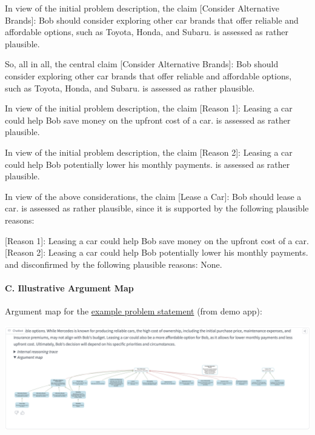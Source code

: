 \documentclass[
  letterpaper,
  DIV=11,
  numbers=noendperiod]{scrartcl}
\let\oldparagraph\paragraph
\renewcommand{\paragraph}[1]{\oldparagraph{#1}\mbox{}}
\newenvironment{Shaded}{\begin{snugshade}}{\end{snugshade}}
\newcommand{\CommentTok}[1]{\textcolor[rgb]{0.37,0.37,0.37}{#1}}
\newcommand{\NormalTok}[1]{\textcolor[rgb]{0.00,0.23,0.31}{#1}}
\newcommand{\OtherTok}[1]{\textcolor[rgb]{0.00,0.23,0.31}{#1}}
\begin{document}
\begin{Shaded}
\begin{Highlighting}[]
\NormalTok{In view of the initial problem description, the claim \textquotesingle{}}\CommentTok{[}\OtherTok{Consider Alternative Brands}\CommentTok{]}\NormalTok{: Bob should consider exploring other car brands that offer reliable and affordable options, such as Toyota, Honda, and Subaru.\textquotesingle{} is assessed as rather plausible.}

\NormalTok{So, all in all, the central claim \textquotesingle{}}\CommentTok{[}\OtherTok{Consider Alternative Brands}\CommentTok{]}\NormalTok{: Bob should consider exploring other car brands that offer reliable and affordable options, such as Toyota, Honda, and Subaru.\textquotesingle{} is assessed as rather plausible.}

\NormalTok{In view of the initial problem description, the claim \textquotesingle{}}\CommentTok{[}\OtherTok{Reason 1}\CommentTok{]}\NormalTok{: Leasing a car could help Bob save money on the upfront cost of a car.\textquotesingle{} is assessed as rather plausible.}

\NormalTok{In view of the initial problem description, the claim \textquotesingle{}}\CommentTok{[}\OtherTok{Reason 2}\CommentTok{]}\NormalTok{: Leasing a car could help Bob potentially lower his monthly payments.\textquotesingle{} is assessed as rather plausible.}

\NormalTok{In view of the above considerations, the claim \textquotesingle{}}\CommentTok{[}\OtherTok{Lease a Car}\CommentTok{]}\NormalTok{: Bob should lease a car.\textquotesingle{} is assessed as rather plausible, since it is supported by the following plausible reasons:}

\OtherTok{[Reason 1]: }\NormalTok{Leasing a car could help Bob save money on the upfront cost of a car.}
\OtherTok{[Reason 2]: }\NormalTok{Leasing a car could help Bob potentially lower his monthly payments.}
\NormalTok{and disconfirmed by the following plausible reasons:}
\NormalTok{None.}
\end{Highlighting}
\end{Shaded}

\hypertarget{c.-illustrative-argument-map}{%
\paragraph{C. Illustrative Argument
Map}\label{c.-illustrative-argument-map}}

Argument map for the
\protect\hyperlink{appendix-example-problem}{example problem statement}
(from demo app):

\includegraphics{figs/illustrative_argumentmap.png}
\end{document}
